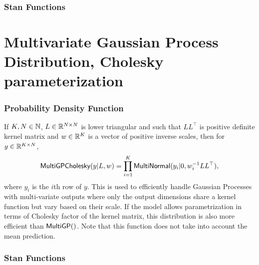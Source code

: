 
\subsubsection{Stan Functions}

\begin{description}
%
%
\end{description}


\section{Multivariate Gaussian Process Distribution, Cholesky parameterization}

\subsubsection{Probability Density Function}

If $K,N \in \nats$, $L \in \reals^{N \times N}$ is lower
triangular and such that $LL^{\top}$ is positive definite kernel matrix
and $w \in \reals^{K}$ is a vector of positive
inverse scales, then for $y \in \reals^{K \times N}$,
\[
\distro{MultiGPCholesky}(y|L,w)
=
\prod_{i=1}^{K} \distro{MultiNormal}(y_i|0,w_i^{-1} LL^{\top}),
\]
where $y_i$ is the $i$th row of $y$.  This is used to efficiently handle
Gaussian Processes with multi-variate outputs where only the output dimensions
share a kernel function but vary based on their scale.  If the model allows
parametrization in terms of Cholesky factor of the kernel matrix, this distribution
is also more efficient than $\distro{MultiGP}()$. Note that this
function does not take into account the mean prediction.


\subsubsection{Stan Functions}

\begin{description}
%
%
\end{description}


